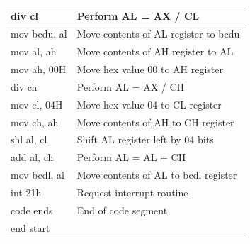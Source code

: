 \documentclass[12pt,a4paper]{article}
\begin{document}
\begin{flushleft}
\begin{table}[htb]
{\begin{tabular}{|l|l|}
\hline
div cl                                                           & Perform AL = AX / CL                          \\
\hline         
mov bcdu, al                                                     & Move contents of AL register to bcdu          \\
\hline
mov al, ah                                                       & Move contents of AH register to AL            \\
\hline
mov ah, 00H                                                      & Move hex value 00 to AH register              \\
\hline
div ch                                                           & Perform AL = AX / CH                          \\
\hline
mov cl, 04H                                                      & Move hex value 04 to CL register              \\
\hline
mov ch, ah                                                       & Move contents of AH to CH register            \\
\hline
shl al, cl                                                       & Shift AL register left by 04 bits             \\
\hline
add al, ch                                                       & Perform AL = AL + CH                          \\
\hline
mov bcdl, al                                                     & Move contents of AL to bcdl register          \\
\hline
int 21h                                                          & Request interrupt routine                     \\ 
\hline
code ends                                                        & End of code segment                           \\
\hline
end start                                                        &                                               \\
\hline
\end{tabular}
}
\end{table}

\newpage

\end{flushleft}
\end{document}
